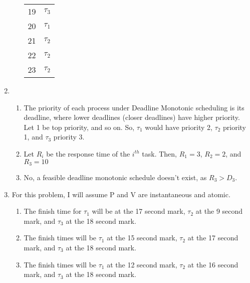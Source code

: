 \documentclass[12pt,letterpaper]{report}
\begin{document}
\begin{enumerate}
\begin{enumerate}
\begin{tabular}{|c|c|}
19 & $\tau_3$\\
20 & $\tau_1$\\
21 & $\tau_2$\\
22 & $\tau_2$\\
23 & $\tau_2$\\
\hline
\end{tabular}
\end{enumerate}
\item \begin{enumerate}
\item The priority of each process under Deadline Monotonic scheduling is its deadline, where lower deadlines (closer deadlines) have higher priority. Let 1 be top priority, and so on. So, $\tau_1$ would have priority 2, $\tau_2$ priority 1, and $\tau_3$ priority 3. 
\item Let $R_i$ be the response time of the $i^{th}$ task. Then, $R_1=3$, $R_2=2$, and $R_3=10$
\item No, a feasible deadline monotonic schedule doesn't exist, as $R_3 > D_3$.
\end{enumerate}
\item For this problem, I will assume P and V are instantaneous and atomic. 
\begin{enumerate}
\item The finish time for $\tau_1$ will be at the 17 second mark, $\tau_2$ at the 9 second mark, and $\tau_3$ at the 18 second mark.
\item The finish times will be $\tau_1$ at the 15 second mark, $\tau_2$ at the 17 second mark, and $\tau_3$ at the 18 second mark. 
\item The finish times will be $\tau_1$ at the 12 second mark, $\tau_2$ at the 16 second mark, and $\tau_3$ at the 18 second mark. 
\end{enumerate}
\end{enumerate}
\end{document}
